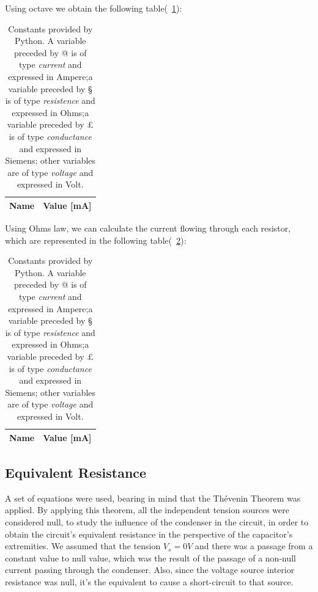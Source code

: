 Using octave we obtain the following table(~\ref{tab:op1}):
\begin{table}[H]
	\centering
	\begin{tabular}{|l|r|}
		\hline    
		{\bf Name} & {\bf Value [mA]} \\ \hline
		
	\end{tabular}
	\caption{Constants provided by Python. A variable preceded by @ is of type {\em current}
		and expressed in Ampere;a variable preceded by § is of type {\it resistence} and expressed in
		Ohms;a variable preceded by £ is of type {\it conductance} and expressed in
		Siemens; other variables are of type {\it voltage} and expressed in
		Volt.}
	\label{tab:op1}
\end{table}

Using Ohms law, we can calculate the current flowing through each resistor, which are represented in the following table(~\ref{tab:op2}):
 \begin{table}[H]
 	\centering
 	\begin{tabular}{|l|r|}
 		\hline    
 		{\bf Name} & {\bf Value [mA]} \\ \hline
 		
 	\end{tabular}
 	\caption{Constants provided by Python. A variable preceded by @ is of type {\em current}
 		and expressed in Ampere;a variable preceded by § is of type {\it resistence} and expressed in
 		Ohms;a variable preceded by £ is of type {\it conductance} and expressed in
 		Siemens; other variables are of type {\it voltage} and expressed in
 		Volt.}
 	\label{tab:op2}
 \end{table}
 

\subsection{Equivalent Resistance}

A set of equations were used, bearing in mind that the Thévenin Theorem was applied. By applying this theorem, all the independent tension sources were considered null, to study the influence of the condenser in the circuit, in order to obtain the circuit's equivalent resistance in the perspective of the capacitor's extremities. We assumed that the tension $V_s = 0V$ and there was a passage from a constant value to null value, which was the result of the passage of a non-null current passing through the condenser. Also, since the voltage source interior resistance was null, it's the equivalent to cause a short-circuit to that source.

